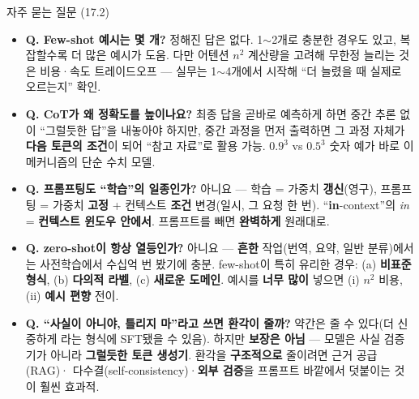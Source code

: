 \documentclass[aspectratio=169,11pt]{beamer}
\begin{document}
\begin{frame}{자주 묻는 질문 (17.2)}
  \begin{itemize}
    \item \textbf{Q. Few-shot 예시는 몇 개?} 정해진 답은
      없다. 1$\sim$2개로 충분한 경우도 있고, 복잡할수록
      더 많은 예시가 도움. 다만 어텐션 $n^2$ 계산량을
      고려해 무한정 늘리는 것은 비용·속도 트레이드오프 —
      실무는 1$\sim$4개에서 시작해 ``더 늘렸을 때 실제로
      오르는지'' 확인.
    \item \textbf{Q. CoT가 왜 정확도를 높이나요?} 최종
      답을 곧바로 예측하게 하면 중간 추론 없이 ``그럴듯한
      답''을 내놓아야 하지만, 중간 과정을 먼저 출력하면 그
      과정 자체가 \textbf{다음 토큰의 조건}이 되어
      ``참고 자료''로 활용 가능. $0.9^3$ vs $0.5^3$ 숫자
      예가 바로 이 메커니즘의 단순 수치 모델.
    \item \textbf{Q. 프롬프팅도 ``학습''의 일종인가?}
      아니요 --- 학습 = 가중치 \textbf{갱신}(영구),
      프롬프팅 = 가중치 \textbf{고정} + 컨텍스트
      \textbf{조건} 변경(일시, 그 요청 한 번).
      ``\textbf{in}-context''의 \textit{in} =
      \textbf{컨텍스트 윈도우 안에서}. 프롬프트를 빼면
      \textbf{완벽하게} 원래대로.
    \item \textbf{Q. zero-shot이 항상 열등인가?} 아니요 ---
      \textbf{흔한} 작업(번역, 요약, 일반 분류)에서는
      사전학습에서 수십억 번 봤기에 충분. few-shot이 특히
      유리한 경우: (a) \textbf{비표준 형식}, (b)
      \textbf{다의적 라벨}, (c) \textbf{새로운 도메인}.
      예시를 \textbf{너무 많이} 넣으면 (i) $n^2$ 비용,
      (ii) \textbf{예시 편향} 전이. 
    \item \textbf{Q. ``사실이 아니야, 틀리지 마''라고 쓰면
      환각이 줄까?} 약간은 줄 수 있다(더 신중하게 라는
      형식에 SFT됐을 수 있음). 하지만 \textbf{보장은
      아님} --- 모델은 사실 검증기가 아니라
      \textbf{그럴듯한 토큰 생성기}. 환각을
      \textbf{구조적으로} 줄이려면 근거 공급(RAG)·
      다수결(self-consistency)·\textbf{외부 검증}을
      프롬프트 바깥에서 덧붙이는 것이 훨씬 효과적.
  \end{itemize}
\end{frame}
\end{document}
